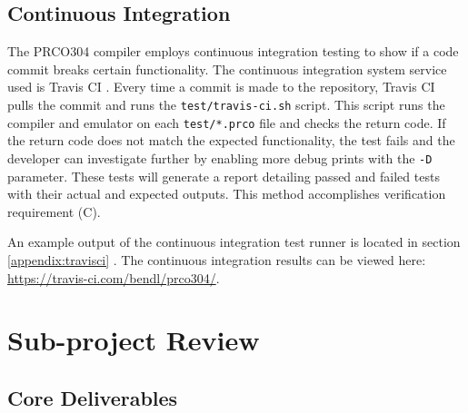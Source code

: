 \documentclass[11pt,a4paper]{report}
\newcommand{\scname}{PRCO304}
\begin{document}
\subsection*{Continuous Integration}
The \scname{} compiler employs continuous integration testing to show if a code commit breaks certain functionality. The continuous integration system service used is Travis CI \cite{travisci}. Every time a commit is made to the repository, Travis CI pulls the commit and runs the \verb|test/travis-ci.sh| script. This script runs the compiler and emulator on each \verb|test/*.prco| file and checks the return code. If the return code does not match the expected functionality, the test fails and the developer can investigate further by enabling more debug prints with the \verb|-D| parameter. These tests will generate a report detailing passed and failed tests with their actual and expected outputs. This method accomplishes verification requirement (C).

An example output of the continuous integration test runner is located in section \ref{appendix:travisci} {}. The continuous integration results can be viewed here: \url{https://travis-ci.com/bendl/prco304/}.

\newpage
\section{Sub-project Review}
\subsection{Core Deliverables}
\end{document}
